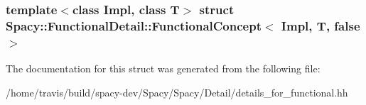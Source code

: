 \subsubsection*{template$<$class Impl, class T$>$ struct Spacy\-::\-Functional\-Detail\-::\-Functional\-Concept$<$ Impl, T, false $>$}



\-The documentation for this struct was generated from the following file\-:\begin{DoxyCompactItemize}
\item 
/home/travis/build/spacy-\/dev/\-Spacy/\-Spacy/\-Detail/details\-\_\-for\-\_\-functional.\-hh\end{DoxyCompactItemize}
